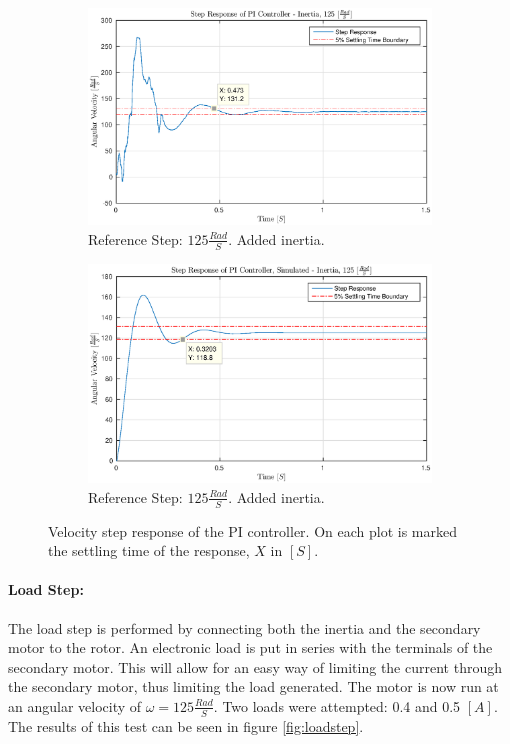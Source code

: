 \begin{figure}[!h]
	\begin{subfigure}[t]{.49\linewidth}
		\centering
		\includegraphics[width=\textwidth]{graphics/step_125_pi_inertia_real}
		\caption{Reference Step: $125 \frac{Rad}{S}$. Added inertia.}
		\label{fig:stepinertiareal}
	\end{subfigure}
	\begin{subfigure}[t]{.49\linewidth}
		\centering
		\includegraphics[width=\textwidth]{graphics/step_125_pi_inertia_simulated}
		\caption{Reference Step: $125 \frac{Rad}{S}$. Added inertia.}
		\label{fig:stepinertiasimulated}
	\end{subfigure}
	\caption[Velocity step response of PI controller with inertia.]{Velocity step response of the PI controller. On each plot is marked the settling time of the response, $X$ in $[S]$.}
	\label{fig:stepinertia}
\end{figure}

\paragraph{Load Step:}
The load step is performed by connecting both the inertia and the secondary motor to the rotor.
An electronic load is put in series with the terminals of the secondary motor.
This will allow for an easy way of limiting the current through the secondary motor, thus limiting the load generated.
The motor is now run at an angular velocity of $\omega=125\frac{Rad}{S}$.
Two loads were attempted: 0.4 and 0.5 $[A]$.
The results of this test can be seen in figure \ref{fig:loadstep}.


